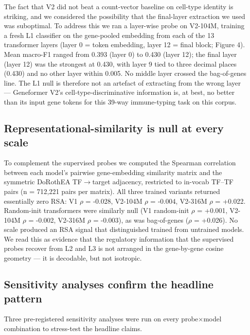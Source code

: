 \documentclass[10pt]{article}
\begin{document}
The fact that V2 did not beat a count-vector baseline on cell-type
identity is striking, and we considered the possibility that the
final-layer extraction we used was suboptimal. To address this we ran a
layer-wise probe on V2-104M, training a fresh L1 classifier on the
gene-pooled embedding from each of the 13 transformer layers (layer 0 =
token embedding, layer 12 = final block; Figure 4). Mean macro-F1 ranged
from 0.393 (layer 0) to 0.430 (layer 12); the final layer (layer 12)
was the strongest at 0.430, with layer 9 tied to three decimal places
(0.430) and no other layer within 0.005. No middle layer crossed the bag-of-genes line. The L1
null is therefore not an artefact of extracting from the wrong layer ---
Geneformer V2's cell-type-discriminative information is, at best, no
better than its input gene tokens for this 39-way immune-typing task on
this corpus.

\subsection{Representational-similarity is null at every
scale}\label{representational-similarity-is-null-at-every-scale}

To complement the supervised probes we computed the Spearman correlation
between each model's pairwise gene-embedding similarity matrix and the
symmetric DoRothEA TF$\to$target adjacency, restricted to in-vocab TF--TF
pairs (n = 712,221 pairs per matrix). All three trained variants
returned essentially zero RSA: V1 $\rho$ = -0.028, V2-104M $\rho$ = -0.004,
V2-316M $\rho$ = +0.022. Random-init transformers were similarly null (V1 random-init $\rho$ = +0.001, V2-104M $\rho$ = -0.002, V2-316M $\rho$ = -0.003), as was bag-of-genes ($\rho$ = +0.026). No scale produced an RSA
signal that distinguished trained from untrained models. We read this as
evidence that the regulatory information that the supervised probes
recover from L2 and L3 is not arranged in the gene-by-gene cosine
geometry --- it is decodable, but not isotropic.

\subsection{Sensitivity analyses confirm the headline
pattern}\label{sensitivity-analyses-confirm-the-headline-pattern}

Three pre-registered sensitivity analyses were run on every probe$\times$model
combination to stress-test the headline claims.
\end{document}
